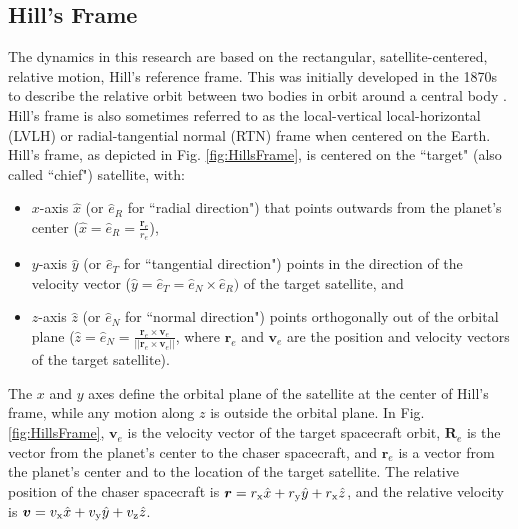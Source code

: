 \documentclass[twocolumn,letterpaper]{IEEEAerospaceCLS}  %
\theoremstyle{definition}
\begin{document}
\subsection{Hill's Frame}
The dynamics in this research are based on the rectangular, satellite-centered, relative motion, Hill's reference frame. This was initially developed in the 1870s to describe the relative orbit between two bodies in orbit around a central body \cite{hill1878researches}. Hill's frame is also sometimes referred to as the local-vertical local-horizontal (LVLH) or radial-tangential normal (RTN) frame when centered on the Earth. Hill's frame, as depicted in Fig. \ref{fig:HillsFrame}, is centered on the ``target" (also called ``chief") satellite, with:
\begin{itemize}
\item $x$-axis $\hat{x}$ (or $\hat{e}_R$ for ``radial direction") that points outwards from the planet's center ($\hat{x} = \hat{e}_R = \frac{\boldsymbol{r}_e}{r_e}$), 
\item $y$-axis $\hat{y}$ (or $\hat{e}_T$ for ``tangential direction") points in the direction of the velocity vector ($\hat{y} = \hat{e}_T = \hat{e}_N\times{\hat{e}}_R)$ of the target satellite, and
\item $z$-axis $\hat{z}$ (or $\hat{e}_N$ for ``normal direction") points orthogonally out of the orbital plane ($\hat{z} = \hat{e}_N = \frac{\boldsymbol{r}_e\times\boldsymbol{v}_e}{||\boldsymbol{r}_e\times\boldsymbol{v}_e||}$, where $\boldsymbol{r}_e$ and $\boldsymbol{v}_e$ are the position and velocity vectors of the target satellite).
\end{itemize}
The $x$ and $y$ axes define the orbital plane of the satellite at the center of Hill's frame, while any motion along $z$ is outside the orbital plane. 
In Fig. \ref{fig:HillsFrame}, $\boldsymbol{v}_e$ is the velocity vector of the target spacecraft orbit,
$\boldsymbol{R}_e$ is the vector from the planet's center to the chaser spacecraft, and $\boldsymbol{r}_e$ is a vector from the planet's center and to the location of the target satellite.
The relative position of the chaser spacecraft is $\boldsymbol{r}=r_{\rm x}\hat{x} +r_{\rm y}\hat{y} +r_{\rm x}\hat{z}$, and the relative velocity is $\boldsymbol{v}=v_{\rm x}\hat{x} +v_{\rm y}\hat{y} +v_{\rm z}\hat{z}$. 
\end{document}

